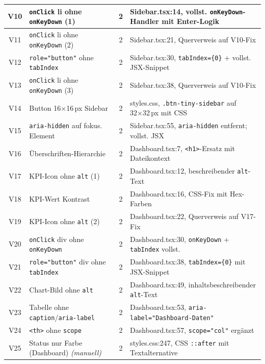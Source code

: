 \begin{longtable}{|c|p{5.2cm}|c|p{5.8cm}|}
\hline
V10 & \texttt{onClick} li ohne \texttt{onKeyDown} (1) & 2 & Sidebar.tsx:14, vollst. \texttt{onKeyDown}-Handler mit Enter-Logik \\
\hline
V11 & \texttt{onClick} li ohne \texttt{onKeyDown} (2) & 2 & Sidebar.tsx:21, Querverweis auf V10-Fix \\
\hline
V12 & \texttt{role="button"} ohne \texttt{tabIndex} & 2 & Sidebar.tsx:30, \texttt{tabIndex=\{0\}} + vollst. JSX-Snippet \\
\hline
V13 & \texttt{onClick} li ohne \texttt{onKeyDown} (3) & 2 & Sidebar.tsx:38, Querverweis auf V10-Fix \\
\hline
V14 & Button 16×16\,px Sidebar                    & 2 & styles.css, \texttt{.btn-tiny-sidebar} auf 32×32\,px mit CSS \\
\hline
V15 & \texttt{aria-hidden} auf fokus. Element      & 2 & Sidebar.tsx:55, \texttt{aria-hidden} entfernt; vollst. JSX \\
\hline
V16 & Überschriften-Hierarchie                     & 2 & Dashboard.tsx:7, \texttt{<h1>}-Ersatz mit Dateikontext \\
\hline
V17 & KPI-Icon ohne \texttt{alt} (1)               & 2 & Dashboard.tsx:12, beschreibender \texttt{alt}-Text \\
\hline
V18 & KPI-Wert Kontrast                            & 2 & Dashboard.tsx:16, CSS-Fix mit Hex-Farben \\
\hline
V19 & KPI-Icon ohne \texttt{alt} (2)               & 2 & Dashboard.tsx:22, Querverweis auf V17-Fix \\
\hline
V20 & \texttt{onClick} div ohne \texttt{onKeyDown} & 2 & Dashboard.tsx:30, \texttt{onKeyDown} + \texttt{tabIndex} vollst. \\
\hline
V21 & \texttt{role="button"} div ohne \texttt{tabIndex} & 2 & Dashboard.tsx:38, \texttt{tabIndex=\{0\}} mit JSX-Snippet \\
\hline
V22 & Chart-Bild ohne \texttt{alt}                 & 2 & Dashboard.tsx:49, inhaltsbeschreibender \texttt{alt}-Text \\
\hline
V23 & Tabelle ohne \texttt{caption}/\texttt{aria-label} & 2 & Dashboard.tsx:53, \texttt{aria-label="Dashboard-Daten"} \\
\hline
V24 & \texttt{<th>} ohne \texttt{scope}            & 2 & Dashboard.tsx:57, \texttt{scope="col"} ergänzt \\
\hline
V25 & Status nur Farbe (Dashboard) \textit{(manuell)} & 2 & styles.css:247, CSS \texttt{::after} mit Textalternative \\
\hline

\end{longtable}

